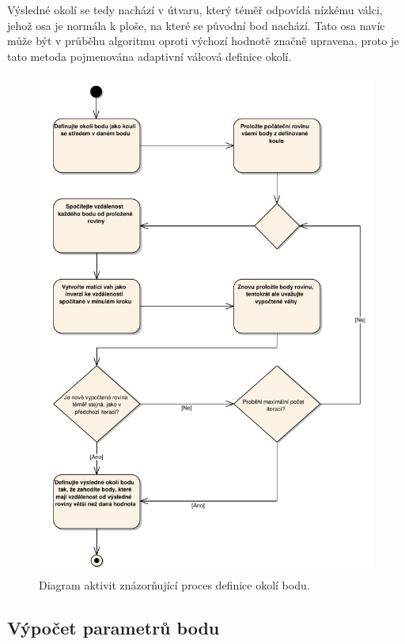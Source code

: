 \documentclass[11pt,twoside,a4paper]{book}
\begin{document}
Výsledné okolí se tedy nachází v útvaru, který téměř odpovídá nízkému válci, jehož osa je normála k ploše, na které se původní bod nachází. Tato osa navíc může být v průběhu algoritmu oproti výchozí hodnotě značně upravena, proto je tato metoda pojmenována adaptivní válcová definice okolí. 

\begin{figure}[htp]
\begin{center}
\includegraphics[width=\textwidth]{figures/2-1-okoli-diagram}
\caption{Diagram aktivit znázorňující proces definice okolí bodu.}
\label{fig:diagram-okoli}
\end{center}
\end{figure}

\newpage
\subsection{Výpočet parametrů bodu}
\end{document}
